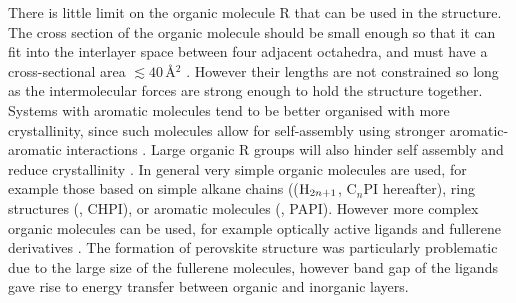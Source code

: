 There is little limit on the organic molecule R that can be used in the structure. The cross section of the organic molecule should be small enough so that it can fit into the interlayer space between four adjacent octahedra, and must have a cross-sectional area $\lesssim 40$\,\AA$^2$  \cite{Mitzi2001a}. However their lengths are not constrained so long as the intermolecular forces are strong enough to hold the structure together. Systems with aromatic molecules tend to be better organised with more crystallinity, since such molecules allow for self-assembly using stronger aromatic-aromatic interactions \cite{Zhang2009}. Large organic R groups will also hinder self assembly and reduce crystallinity \cite{Zhang2009}. In general very simple organic molecules are used, for example those based on simple alkane chains (($\textnormal{H}_{2n+1}$, C$_n$PI hereafter), ring structures (, CHPI), or aromatic molecules (, PAPI). However more complex organic molecules can be used, for example optically active ligands \cite{Billing2006, Teshima2003} and fullerene derivatives \cite{Kikuchi2005, Kawabata2009}. The formation of perovskite structure was particularly problematic due to the large size of the fullerene molecules, however band gap of the ligands gave rise to energy transfer between organic and inorganic layers.


